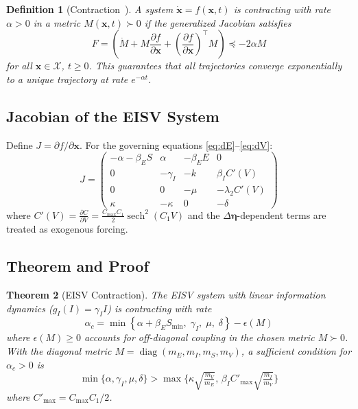 \documentclass[11pt,twocolumn]{article}
\newtheorem{theorem}{Theorem}[section]
\newtheorem{definition}[theorem]{Definition}
\newcommand{\eisv}{\ensuremath{\mathbf{x}}}
\newcommand{\deta}{\ensuremath{\Delta\bm{\eta}}}
\begin{document}
\begin{definition}[Contraction~\cite{lohmiller1998contraction}]
A system $\dot{\eisv} = f(\eisv, t)$ is \emph{contracting} with
rate $\alpha > 0$ in a metric $M(\eisv, t) \succ 0$ if the
generalized Jacobian satisfies
\begin{equation}
  F = \left(\dot{M} + M\frac{\partial f}{\partial \eisv}
  + \left(\frac{\partial f}{\partial \eisv}\right)^\top M\right)
  \preceq -2\alpha M
  \label{eq:contraction-condition}
\end{equation}
for all $\eisv \in \mathcal{X}$, $t \geq 0$. This guarantees that
all trajectories converge exponentially to a unique trajectory at
rate $e^{-\alpha t}$.
\end{definition}

\subsection*{Jacobian of the EISV System}

Define $J = \partial f / \partial \eisv$. For the governing
equations \eqref{eq:dE}--\eqref{eq:dV}:
\begin{equation}
J = \begin{pmatrix}
-\alpha - \beta_E S & \alpha & -\beta_E E & 0 \\
0 & -\gamma_I & -k & \beta_I C'(V) \\
0 & 0 & -\mu & -\lambda_2 C'(V) \\
\kappa & -\kappa & 0 & -\delta
\end{pmatrix}
\label{eq:jacobian}
\end{equation}
where $C'(V) = \frac{\partial C}{\partial V} =
\frac{C_{\max} C_1}{2}\operatorname{sech}^2(C_1 V)$ and the
$\deta$-dependent terms are treated as exogenous forcing.

\subsection*{Theorem and Proof}

\begin{theorem}[EISV Contraction]
\label{thm:contraction}
The EISV system with linear information dynamics
($g_I(I) = \gamma_I I$) is contracting with rate
\begin{equation}
  \alpha_c = \min\left\{
    \alpha + \beta_E S_{\min},\;
    \gamma_I,\;
    \mu,\;
    \delta
  \right\} - \epsilon(M)
  \label{eq:contraction-rate}
\end{equation}
where $\epsilon(M) \geq 0$ accounts for off-diagonal coupling in
the chosen metric $M \succ 0$. With the diagonal metric
$M = \operatorname{diag}(m_E, m_I, m_S, m_V)$, a sufficient
condition for $\alpha_c > 0$ is
\begin{equation}
  \min\{\alpha, \gamma_I, \mu, \delta\} >
  \max\!\bigl\{
    \kappa\!\sqrt{\tfrac{m_V}{m_E}},\,
    \beta_I C'_{\max}\!\sqrt{\tfrac{m_I}{m_V}}
  \bigr\}
  \label{eq:contraction-sufficient}
\end{equation}
where $C'_{\max} = C_{\max}C_1/2$.
\end{theorem}
\end{document}
